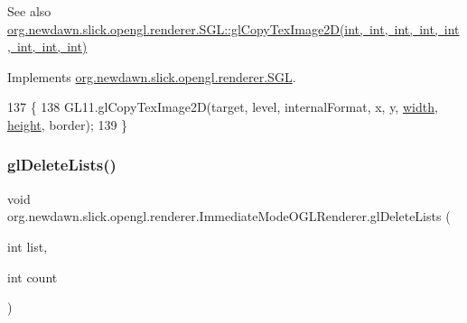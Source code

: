 \begin{DoxySeeAlso}{See also}
\mbox{\hyperlink{interfaceorg_1_1newdawn_1_1slick_1_1opengl_1_1renderer_1_1_s_g_l_a444c1cfd39d478eedbfc5c1022bc11eb}{org.\+newdawn.\+slick.\+opengl.\+renderer.\+S\+G\+L\+::gl\+Copy\+Tex\+Image2\+D(int, int, int, int, int, int, int, int)}} 
\end{DoxySeeAlso}


Implements \mbox{\hyperlink{interfaceorg_1_1newdawn_1_1slick_1_1opengl_1_1renderer_1_1_s_g_l_a444c1cfd39d478eedbfc5c1022bc11eb}{org.\+newdawn.\+slick.\+opengl.\+renderer.\+S\+GL}}.


\begin{DoxyCode}
137                                                                                                            
                        \{
138         GL11.glCopyTexImage2D(target, level, internalFormat, x, y, \mbox{\hyperlink{classorg_1_1newdawn_1_1slick_1_1opengl_1_1renderer_1_1_immediate_mode_o_g_l_renderer_a65d0a04d747368ea954f69074d9102d6}{width}}, 
      \mbox{\hyperlink{classorg_1_1newdawn_1_1slick_1_1opengl_1_1renderer_1_1_immediate_mode_o_g_l_renderer_aec68994a0ee3b7b478122af823c8a8d7}{height}}, border);
139     \}
\end{DoxyCode}
\mbox{\label{classorg_1_1newdawn_1_1slick_1_1opengl_1_1renderer_1_1_immediate_mode_o_g_l_renderer_a47e9f1e741fe05b4649ecdb92bd2d119}} 
\subsubsection{\texorpdfstring{gl\+Delete\+Lists()}{glDeleteLists()}}
{\footnotesize\ttfamily void org.\+newdawn.\+slick.\+opengl.\+renderer.\+Immediate\+Mode\+O\+G\+L\+Renderer.\+gl\+Delete\+Lists (\begin{DoxyParamCaption}\item[{int}]{list,  }\item[{int}]{count }\end{DoxyParamCaption})\hspace{0.3cm}{\ttfamily [inline]}}

